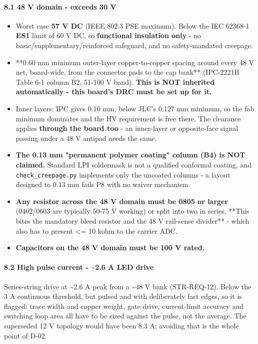 \documentclass[11pt,a4paper]{article}
\begin{document}
\paragraph*{8.1 48 V domain - exceeds 30 V}
\begin{itemize}
\item Worst case \textbf{57 V DC} (IEEE 802.3 PSE maximum). Below the IEC 62368-1 \textbf{ES1} limit of
60 V DC, so \textbf{functional insulation only} - no basic/supplementary/reinforced safeguard,
and no safety-mandated creepage.
\item {*}{*}0.60 mm minimum outer-layer copper-to-copper spacing around every 48 V net, board-wide,
from the connector pads to the cap bank{*}{*} (IPC-2221B Table 6-1 column B2, 51-100 V band).
\textbf{This is NOT inherited automatically - this board's DRC must be set up for it.}
\item Inner layers: IPC gives 0.10 mm, below JLC's 0.127 mm minimum, so the fab minimum dominates
and the HV requirement is free there. The clearance applies \textbf{through the board too} - an
inner-layer or opposite-face signal passing under a 48 V antipad needs the same.
\item \textbf{The 0.13 mm "permanent polymer coating" column (B4) is NOT claimed.} Standard LPI
soldermask is not a qualified conformal coating, and \texttt{check\_creepage.py} implements only the
uncoated columns - a layout designed to 0.13 mm fails P8 with no waiver mechanism.
\item \textbf{Any resistor across the 48 V domain must be 0805 or larger} (0402/0603 are typically
50-75 V working) or split into two in series. {*}{*}This bites the mandatory bleed resistor and
the 48 V rail-sense divider{*}{*} - which also has to present \textless{}= 10 kohm to the carrier ADC.
\item \textbf{Capacitors on the 48 V domain must be 100 V rated.}
\end{itemize}
\paragraph*{8.2 High pulse current - \textasciitilde{}2.6 A LED drive}
Series-string drive at \textasciitilde{}2.6 A peak from a \textasciitilde{}48 V bank (STR-REQ-12). Below the 3 A continuous threshold, but pulsed and with deliberately fast edges, so it is flagged: trace width and copper weight, gate drive, current-limit accuracy and switching loop area all have to be sized against the pulse, not the average. The superseded 12 V topology would have been 8.3 A; avoiding that is the whole point of D-02.
\end{document}
